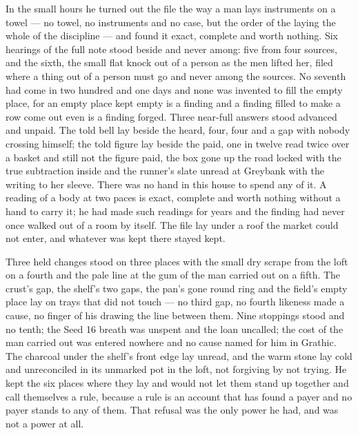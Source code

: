 \scenebreak

In the small hours he turned out the file the way a man lays instruments on a towel --- no towel, no instruments and no case, but the order of the laying the whole of the discipline --- and found it exact, complete and worth nothing. Six hearings of the full note stood beside and never among: five from four sources, and the sixth, the small flat knock out of a person as the men lifted her, filed where a thing out of a person must go and never among the sources. No seventh had come in two hundred and one days and none was invented to fill the empty place, for an empty place kept empty is a finding and a finding filled to make a row come out even is a finding forged. Three near-full answers stood advanced and unpaid. The told bell lay beside the heard, four, four and a gap with nobody crossing himself; the told figure lay beside the paid, one in twelve read twice over a basket and still not the figure paid, the box gone up the road locked with the true subtraction inside and the runner's slate unread at Greybank with the writing to her sleeve. There was no hand in this house to spend any of it. A reading of a body at two paces is exact, complete and worth nothing without a hand to carry it; he had made such readings for years and the finding had never once walked out of a room by itself. The file lay under a roof the market could not enter, and whatever was kept there stayed kept.

Three held changes stood on three places with the small dry scrape from the loft on a fourth and the pale line at the gum of the man carried out on a fifth. The crust's gap, the shelf's two gaps, the pan's gone round ring and the field's empty place lay on trays that did not touch --- no third gap, no fourth likeness made a cause, no finger of his drawing the line between them. Nine stoppings stood and no tenth; the Seed 16 breath was unspent and the loan uncalled; the cost of the man carried out was entered nowhere and no cause named for him in Grathic. The charcoal under the shelf's front edge lay unread, and the warm stone lay cold and unreconciled in its unmarked pot in the loft, not forgiving by not trying. He kept the six places where they lay and would not let them stand up together and call themselves a rule, because a rule is an account that has found a payer and no payer stands to any of them. That refusal was the only power he had, and was not a power at all.

